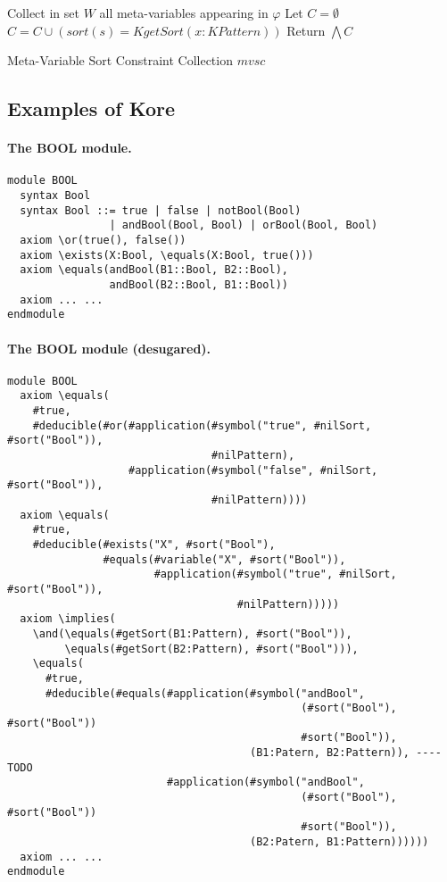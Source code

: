 \documentclass[UTF8,11pt]{article}
\theoremstyle{plain}
\theoremstyle{definition}
\theoremstyle{remark}
\newcommand{\cln}{{:}}
\newcommand{\KPattern}{\mathit{KPattern}}
\newcommand{\KgetSort}{\mathit{KgetSort}}
\begin{document}
\begin{algorithm}
	Collect in set $W$ all meta-variables appearing in $\varphi$\;
	Let $C = \emptyset$\;
	\ForEach{$x \cln \cln s \in W$}
	{$C = C \cup (\mathit{sort(s)} = \KgetSort(x \cln \KPattern))$}
	Return $\bigwedge C$\;
	\caption{Meta-Variable Sort Constraint Collection $\mathit{mvsc}$}
	\label{alg:mvsc}
\end{algorithm}


\subsection{Examples of Kore}
\label{sec:examples-of-kore}


\paragraph{The {\small BOOL} module.}\quad
\begin{Verbatim}[fontsize=\small]
module BOOL
  syntax Bool
  syntax Bool ::= true | false | notBool(Bool)
                | andBool(Bool, Bool) | orBool(Bool, Bool)
  axiom \or(true(), false())
  axiom \exists(X:Bool, \equals(X:Bool, true()))
  axiom \equals(andBool(B1::Bool, B2::Bool), 
                andBool(B2::Bool, B1::Bool))
  axiom ... ...
endmodule
\end{Verbatim}

\paragraph{The {\small BOOL} module (desugared).}\quad
\begin{Verbatim}[fontsize=\small]
module BOOL
  axiom \equals(
    #true,
    #deducible(#or(#application(#symbol("true", #nilSort, #sort("Bool")),
                                #nilPattern), 
                   #application(#symbol("false", #nilSort, #sort("Bool")),
                                #nilPattern))))
  axiom \equals(
    #true,
    #deducible(#exists("X", #sort("Bool"), 
               #equals(#variable("X", #sort("Bool")), 
                       #application(#symbol("true", #nilSort, #sort("Bool")),
                                    #nilPattern)))))
  axiom \implies(
    \and(\equals(#getSort(B1:Pattern), #sort("Bool")), 
         \equals(#getSort(B2:Pattern), #sort("Bool"))),
    \equals(
      #true,
      #deducible(#equals(#application(#symbol("andBool", 
                                              (#sort("Bool"), #sort("Bool"))
                                              #sort("Bool")), 
                                      (B1:Patern, B2:Pattern)), ---- TODO
                         #application(#symbol("andBool", 
                                              (#sort("Bool"), #sort("Bool"))
                                              #sort("Bool")), 
                                      (B2:Patern, B1:Pattern))))))
  axiom ... ...
endmodule
\end{Verbatim}
\end{document}
